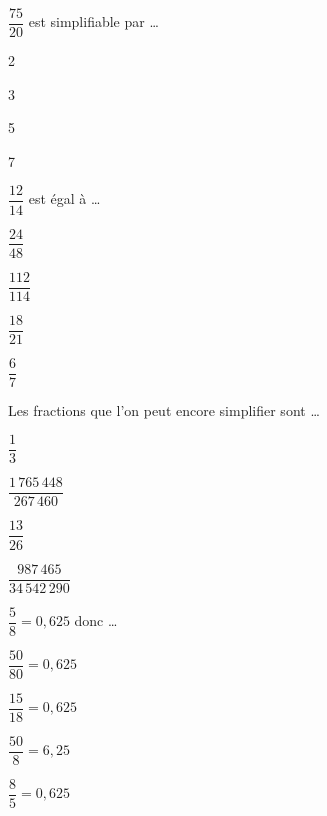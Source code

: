 \begin{QCM}
\begin{GroupeQCM}
    
    \begin{exercice}
      $\dfrac{75}{20}$ est simplifiable par \ldots
      \begin{ChoixQCM}{4}
      \item 2
      \item 3
      \item 5
      \item 7
      \end{ChoixQCM}
\begin{corrige}
   \end{corrige}
    \end{exercice}


    \begin{exercice}
      $\dfrac{12}{14}$ est égal à \ldots
      \begin{ChoixQCM}{4}
      \item $\dfrac{24}{48}$
      \item $\dfrac{112}{114}$
      \item $\dfrac{18}{21}$
      \item $\dfrac{6}{7}$
      \end{ChoixQCM}
\begin{corrige}
   \end{corrige}
    \end{exercice}
    
    
    \begin{exercice}
      Les fractions que l'on peut encore simplifier sont \ldots
      \begin{ChoixQCM}{4}
      \item $\dfrac{1}{3}$
      \item $\dfrac{1\,765\,448}{267\,460}$
      \item $\dfrac{13}{26}$
      \item $\dfrac{987\,465}{34\,542\,290}$
      \end{ChoixQCM}
\begin{corrige}
   \end{corrige}
    \end{exercice}
    
    
    \begin{exercice}
      $\dfrac{5}{8} = 0,625$ donc \ldots
      \begin{ChoixQCM}{4}
      \item $\dfrac{50}{80} = 0,625$
      \item $\dfrac{15}{18} = 0,625$
      \item $\dfrac{50}{8} = 6,25$
      \item $\dfrac{8}{5} = 0,625$      
      \end{ChoixQCM}
\begin{corrige}
   \end{corrige}
    \end{exercice}
    \end{GroupeQCM}
\end{QCM}
 


